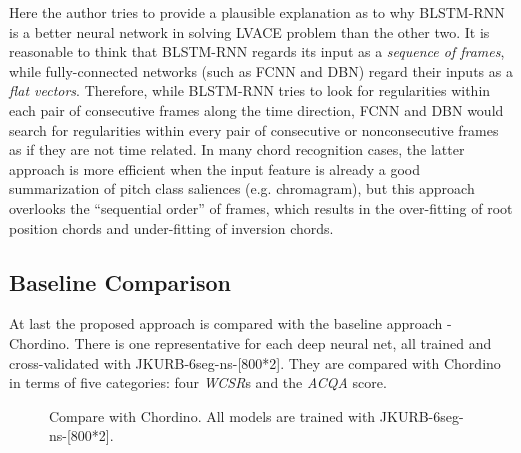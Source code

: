 Here the author tries to provide a plausible explanation as to why BLSTM-RNN is a better neural network in solving LVACE problem than the other two. It is reasonable to think that BLSTM-RNN regards its input as a {\it sequence of frames}, while fully-connected networks (such as FCNN and DBN) regard their inputs as a \textit{flat vectors}. Therefore, while BLSTM-RNN tries to look for regularities within each pair of consecutive frames along the time direction, FCNN and DBN would search for regularities within every pair of consecutive or nonconsecutive frames as if they are not time related. In many chord recognition cases, the latter approach is more efficient when the input feature is already a good summarization of pitch class saliences (e.g. chromagram), but this approach overlooks the ``sequential order'' of frames, which results in the over-fitting of root position chords and under-fitting of inversion chords.

\subsection{Baseline Comparison} \label{sec:3-p9}

At last the proposed approach is compared with the baseline approach - Chordino. There is one representative for each deep neural net, all trained and cross-validated with JKURB-6seg-ns-[800*2]. They are compared with Chordino in terms of five categories: four \textit{WCSR}s and the \textit{ACQA} score.
\begin{figure}[htb]
	\centering
	\caption{Compare with Chordino. All models are trained with JKURB-6seg-ns-[800*2].}
	\label{fig:compchordino}
\end{figure}

